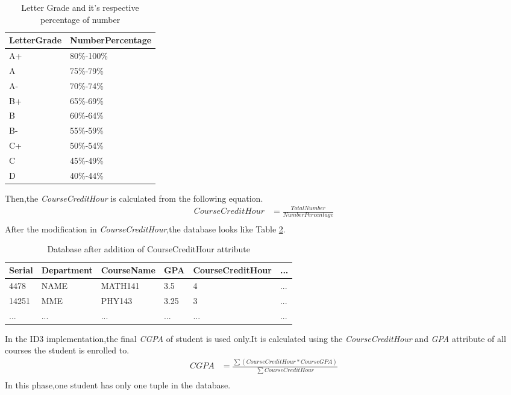 \begin {table}[!H]
\caption {Letter Grade and it's respective percentage of number} \label{tab:title}
\begin{center}
\begin{tabular}{ | m{2.2cm} |  m{4cm} | } 
\hline
LetterGrade & NumberPercentage \\ 
\hline
A+ & 80\%-100\% \\ 
\hline
A & 75\%-79\% \\
\hline
A- & 70\%-74\% \\
\hline
B+ & 65\%-69\% \\
\hline
B & 60\%-64\% \\
\hline
B- & 55\%-59\% \\
\hline
C+ & 50\%-54\% \\
\hline
C & 45\%-49\% \\ 
\hline
D & 40\%-44\% \\
\hline
\end{tabular}
\end{center}
\end{table}
Then,the \textit{CourseCreditHour} is calculated from the following equation.
\begin{equation} \label{eq1}
\begin{split}
CourseCreditHour & = \frac{TotalNumber}{NumberPercentage} \\
\end{split}
\end{equation}
After the modification in \textit{CourseCreditHour},the database looks like Table \ref{tab:tit}.
\begin {table}[ht]
\caption {Database after addition of CourseCreditHour attribute} \label{tab:tit}
\begin{center}
\begin{tabular}{ | m{1cm} |  m{2cm} | m{2.1cm} | m{1cm} | m{3.1cm} | m{0.5cm} | } 
\hline
Serial & Department &  CourseName & GPA & CourseCreditHour & ... \\ 
\hline
4478 & NAME & MATH141 & 3.5 & 4 & ... \\ 
\hline
14251 & MME & PHY143 & 3.25 & 3 & ... \\ 
\hline
... & ... & ... & ... & ... & ... \\ 
\hline
\end{tabular}
\end{center}
\end{table}

In the ID3 implementation,the final \textit{CGPA} of student is used only.It is calculated using the 
\textit{CourseCreditHour} and \textit{GPA}  attribute of all courses the student is enrolled to.
 \begin{equation} \label{eq1}
\begin{split}
CGPA & = \frac{\sum (CourseCreditHour * CourseGPA)}{\sum CourseCreditHour} \\
\end{split}
\end{equation}
In this phase,one student has only one tuple in the database.


